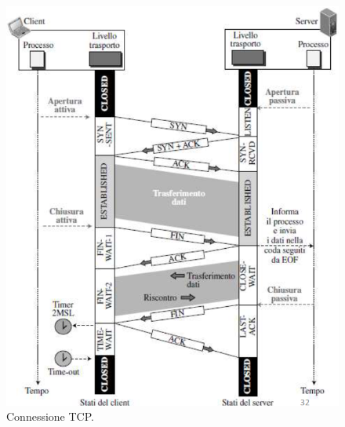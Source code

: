 \begin{figure}[h]
    \centering
    \includegraphics[scale=0.52]{Immagini/ConnessioneTCP.png}
    \caption{Connessione TCP.}
\end{figure}

\newpage

